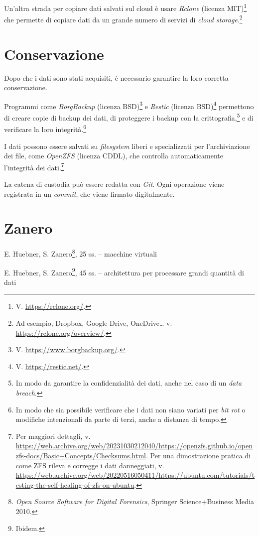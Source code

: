 \documentclass[
  12pt,
  a4paper,
]{book}
\begin{document}
Un'altra strada per copiare dati salvati sul cloud è usare \emph{Rclone}
(licenza MIT)\footnote{V. \url{https://rclone.org/}.} che permette di
copiare dati da un grande numero di servizi di \emph{cloud
storage}.\footnote{Ad esempio, Dropbox, Google Drive, OneDrive\ldots{}
  v. \url{https://rclone.org/overview/}.}

\section{Conservazione}\label{conservazione}

Dopo che i dati sono stati acquisiti, è necessario garantire la loro
corretta conservazione.

Programmi come \emph{BorgBackup} (licenza BSD)\footnote{V.
  \url{https://www.borgbackup.org/}.} e \emph{Restic} (licenza
BSD)\footnote{V. \url{https://restic.net/}.} permettono di creare copie
di backup dei dati, di proteggere i backup con la
crittografia,\footnote{In modo da garantire la confidenzialità dei dati,
  anche nel caso di un \emph{data breach}.} e di verificare la loro
integrità.\footnote{In modo che sia possibile verificare che i dati non
  siano variati per \emph{bit rot} o modifiche intenzionali da parte di
  terzi, anche a distanza di tempo.}

I dati possono essere salvati su \emph{filesystem} liberi e
specializzati per l'archiviazione dei file, come \emph{OpenZFS} (licenza
CDDL), che controlla automaticamente l'integrità dei dati.\footnote{Per
  maggiori dettagli, v.
  \url{https://web.archive.org/web/20231030212040/https://openzfs.github.io/openzfs-docs/Basic+Concepts/Checksums.html}.
  Per una dimostrazione pratica di come ZFS rileva e corregge i dati
  danneggiati, v.
  \url{https://web.archive.org/web/20220516050411/https://ubuntu.com/tutorials/testing-the-self-healing-of-zfs-on-ubuntu}.}

La catena di custodia può essere redatta con \emph{Git}. Ogni operazione
viene registrata in un \emph{commit}, che viene firmato digitalmente.

\section{Zanero}\label{zanero}

E. Huebner, S. Zanero\footnote{\emph{Open Source Software for Digital
  Forensics}, Springer Science+Business Media 2010.}, 25 ss. -- macchine
virtuali

E. Huebner, S. Zanero\footnote{Ibidem.}, 45 ss. -- architettura per
processare grandi quantità di dati
\end{document}
